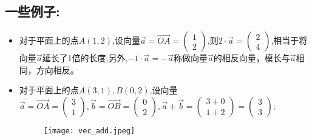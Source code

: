 \documentclass[UTF8]{article}
\begin{document}
\subsection{一些例子:}
\begin{itemize}
	\item 对于平面上的点$A(1, 2)$,设向量$\vec{a} = \overrightarrow{OA} = 
\left(
\begin{array}{l}
1\\
2
\end{array}
\right)$,则$2\cdot \vec{a} = 
\left(
\begin{array}{l}
2\\
4
\end{array}
\right)$,相当于将向量$\vec{a}$延长了1倍的长度;另外,$-1\cdot\vec{a} = -\vec{a}$称做向量$\vec{a}$的相反向量，模长与$\vec{a}$相同，方向相反。

	\item 对于平面上的点$A(3, 1), B(0, 2)$,设向量$\vec{a} = \overrightarrow{OA} = 
\left(
\begin{array}{l}
3\\
1
\end{array}
\right), \vec{b} = \overrightarrow{OB} = 
\left(
\begin{array}{l}
0\\
2
\end{array}
\right), \vec{a} + \vec{b} = 
\left(
\begin{array}{l}
3 + 0\\
1 + 2
\end{array}
\right) = 
\left(
\begin{array}{l}
3\\
3
\end{array}
\right)$;

\begin{figure}{}
\centering\texttt{[image: vec\_add.jpeg]}
\end{figure}
\end{itemize}
\end{document}
